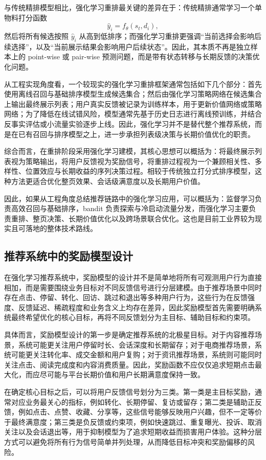 \documentclass[UTF8]{ctexart}
\begin{document}
与传统精排模型相比，强化学习重排最关键的差异在于：传统精排通常学习一个单物料打分函数
\[ \hat{y}_i=f_\theta(s_t,d_i), \]
然后将所有候选按照 \(\hat{y}_i\) 从高到低排序；而强化学习重排更强调``当前选择会影响后续选择''，以及``当前展示结果会影响用户后续状态''。因此，其本质不再是独立样本上的 point-wise 或 pair-wise 预测问题，而是带有状态转移与长期反馈的决策优化问题。

从工程实现角度看，一个较现实的强化学习重排框架通常包括如下几个部分：首先使用离线召回与基础排序模型生成候选集合；然后由强化学习策略网络在候选集合上输出最终展示列表；用户真实反馈被记录为训练样本，用于更新价值网络或策略网络；为了降低在线试错风险，模型通常先基于历史日志进行离线预训练，并结合反事实评估或小流量实验逐步上线。因此，强化学习并不是替代整个推荐系统，而是在已有召回与排序模型之上，进一步承担列表级决策与长期价值优化的职责。

综合而言，在重排阶段采用强化学习建模，其核心思想可以概括为：将最终展示列表视为策略输出，将用户反馈视为奖励信号，将重排过程视为一个兼顾相关性、多样性、位置效应与长期收益的序列决策过程。相较于传统独立打分式排序模型，这种方法更适合优化整页效果、会话级满意度以及长期用户价值。

因此，如果从工程角度总结推荐链路中的强化学习应用，可以概括为：监督学习负责高效召回与基础排序，bandit 负责探索与冷启动流量分发，而强化学习主要负责重排、整页决策、长期价值优化以及跨场景联合优化。这也是目前工业界较为现实且可落地的整体技术路线。
\subsection{推荐系统中的奖励模型设计}

在强化学习推荐系统中，奖励模型的设计并不是简单地将所有可观测用户行为直接相加，而是需要围绕业务目标对不同反馈信号进行分层建模。由于推荐场景中同时存在点击、停留、转化、回访、跳过和退出等多种用户行为，这些行为在反馈强度、反馈延迟、稀疏程度和业务含义上均存在差异，因此奖励模型首先需要明确系统最终希望优化的核心目标，再将不同反馈划分为主目标、辅助目标和约束项。

具体而言，奖励模型设计的第一步是确定推荐系统的北极星目标。对于内容推荐场景，系统可能更关注用户停留时长、会话深度和长期留存；对于电商推荐场景，系统可能更关注转化率、成交金额和用户复购；对于资讯推荐场景，系统则可能同时关注点击、阅读完成度和内容消费质量。因此，奖励函数不应仅仅追求短期点击最大化，而应尽可能与平台长期价值和用户长期满意度保持一致。

在确定核心目标之后，可以将用户反馈信号划分为三类。第一类是主目标奖励，通常对应业务最关心的指标，例如转化、长期停留、复访或留存；第二类是辅助正反馈，例如点击、点赞、收藏、分享等，这些信号能够反映用户兴趣，但不一定等价于最终满意度；第三类是负反馈或约束项，例如快速跳过、重复曝光、投诉、取消关注以及会话退出等，用于抑制模型为了追求短期收益而损害用户体验。这种分层方式可以避免将所有行为信号简单并列处理，从而降低目标冲突和奖励偏移的风险。
\end{document}
